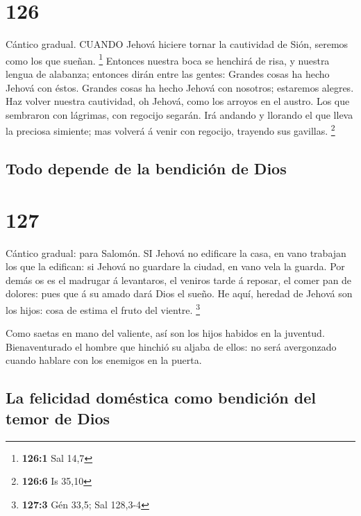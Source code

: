 \hypertarget{section-125}{%
\section{126}\label{section-125}}

 Cántico gradual. CUANDO Jehová hiciere tornar la cautividad
de Sión, seremos como los que sueñan. \footnote{\textbf{126:1} Sal 14,7}
 Entonces nuestra boca se henchirá de risa, y nuestra lengua
de alabanza; entonces dirán entre las gentes: Grandes cosas ha hecho
Jehová con éstos.  Grandes cosas ha hecho Jehová con
nosotros; estaremos alegres.  Haz volver nuestra cautividad,
oh Jehová, como los arroyos en el austro.  Los que sembraron
con lágrimas, con regocijo segarán.  Irá andando y llorando
el que lleva la preciosa simiente; mas volverá á venir con regocijo,
trayendo sus gavillas. \footnote{\textbf{126:6} Is 35,10}

\hypertarget{todo-depende-de-la-bendiciuxf3n-de-dios}{%
\subsection{Todo depende de la bendición de
Dios}\label{todo-depende-de-la-bendiciuxf3n-de-dios}}

\hypertarget{section-126}{%
\section{127}\label{section-126}}

 Cántico gradual: para Salomón. SI Jehová no edificare la
casa, en vano trabajan los que la edifican: si Jehová no guardare la
ciudad, en vano vela la guarda.  Por demás os es el madrugar
á levantaros, el veniros tarde á reposar, el comer pan de dolores: pues
que á su amado dará Dios el sueño.  He aquí, heredad de
Jehová son los hijos: cosa de estima el fruto del vientre. \footnote{\textbf{127:3}
  Gén 33,5; Sal 128,3-4}

 Como saetas en mano del valiente, así son los hijos habidos
en la juventud.  Bienaventurado el hombre que hinchió su
aljaba de ellos: no será avergonzado cuando hablare con los enemigos en
la puerta.

\hypertarget{la-felicidad-domuxe9stica-como-bendiciuxf3n-del-temor-de-dios}{%
\subsection{La felicidad doméstica como bendición del temor de
Dios}\label{la-felicidad-domuxe9stica-como-bendiciuxf3n-del-temor-de-dios}}

